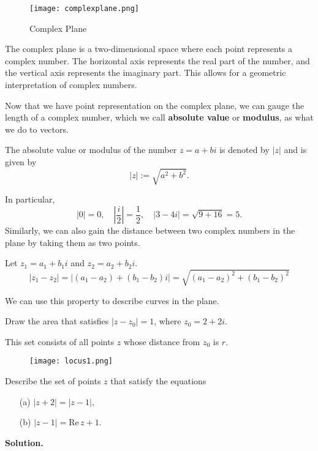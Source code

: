 \begin{figure}[H]
    \centering
    \texttt{[image: complexplane.png]}
    \caption{Complex Plane}
\end{figure}

\begin{definition}
    The complex plane is a two-dimensional space where each point represents a complex number. The horizontal axis represents the real part of the number, and the vertical axis represents the imaginary part. This allows for a geometric interpretation of complex numbers.
\end{definition}
Now that we have point representation on the complex plane, we can gauge the length of a complex number, which we call
\textbf{absolute value} or \textbf{modulus}, as what we do to vectors.
\begin{definition}
    The absolute value or modulus of the number \( z = a + bi \) is denoted by \( |z| \) and is given by
\[ |z| := \sqrt{a^2 + b^2}. \]
\end{definition}
In particular,
\[ |0| = 0, \quad \left|\frac{i}{2}\right| = \frac{1}{2}, \quad |3 - 4i| = \sqrt{9 + 16} = 5. \]
Similarly, we can also gain the distance between two complex numbers in the plane by taking them as two points.
\begin{definition}
    Let \( z_1 = a_1 + b_1i \) and \( z_2 = a_2 + b_2i \). 
    \begin{equation}
        |z_1 - z_2| = |(a_1 - a_2) + (b_1 - b_2)i| = \sqrt{(a_1 - a_2)^2 + (b_1 - b_2)^2}
    \end{equation}
\end{definition}
We can use this property to describe curves in the plane.
\begin{example}
    Draw the area that satisfies $|z-z_0|=1$, where $z_0 = 2+2i$.
\end{example}

This set consists of all points $z$ whose distance from $z_0$ is $r$.
\begin{figure}[H]
    \centering
    \texttt{[image: locus1.png]}
\end{figure}
\begin{example}
    Describe the set of points \( z \) that satisfy the equations

\begin{enumerate}
\item[(a)] \( |z + 2| = |z - 1| \),
\item[(b)] \( |z - 1| = \text{Re} \, z + 1 \).
\end{enumerate}
\end{example}
\textbf{Solution.}


